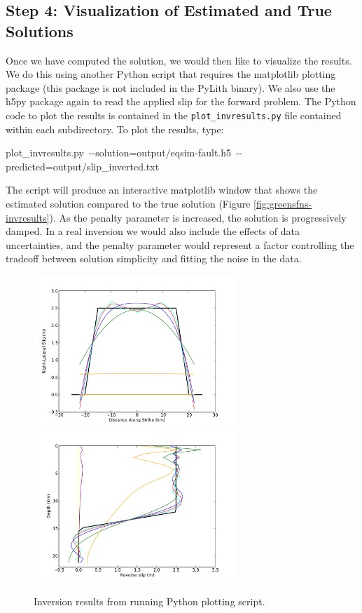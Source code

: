 \subsection{Step 4: Visualization of Estimated and True Solutions}

Once we have computed the solution, we would then like to visualize
the results. We do this using another Python script that requires
the matplotlib plotting package (this package is not included in the
PyLith binary). We also use the h5py package again to read the applied
slip for the forward problem. The Python code to plot the results
is contained in the \texttt{plot\_invresults.py} file contained within
each subdirectory. To plot the results, type:
\begin{lyxcode}
{\small{}plot\_invresults.py~-{}-solution=output/eqsim-fault.h5~-{}-predicted=output/slip\_inverted.txt}{\small \par}
\end{lyxcode}
The script will produce an interactive matplotlib window that shows
the estimated solution compared to the true solution (Figure \vref{fig:greensfns-invresults}).
As the penalty parameter is increased, the solution is progressively
damped. In a real inversion we would also include the effects of data
uncertainties, and the penalty parameter would represent a factor
controlling the tradeoff between solution simplicity and fitting the
noise in the data.

\noindent \begin{center}
\begin{figure}
\begin{centering}
\includegraphics[width=3in]{tutorials/greensfns2d/figs/strikeslip_inversion}\includegraphics[width=3in]{tutorials/greensfns2d/figs/reverse_inversion}
\par\end{centering}

\caption{Inversion results from running Python plotting script.\label{fig:greensfns-invresults}}
\end{figure}

\par\end{center}
